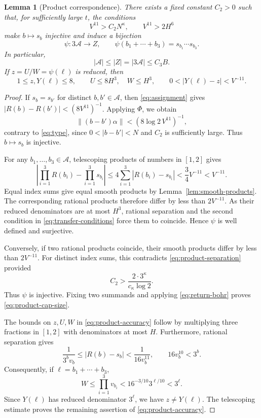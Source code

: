 \documentclass[11pt,reqno]{amsart}
\theoremstyle{definition}
\theoremstyle{plain}
\newtheorem{lemma}{Lemma}[section]
\theoremstyle{definition}
\theoremstyle{remark}
\newcommand{\Bad}{\mathcal A}
\newcommand{\norm}[1]{\lVert#1\rVert}
\begin{document}
\begin{lemma}[Product correspondence]\label{lem:transfer}
There exists a fixed constant $C_2>0$ such
that, for sufficiently large $t$, the conditions
\begin{equation}\label{eq:transfer-conditions}
 V^{11}>C_2N^\kappa,\qquad V^{11}>2H^6
\end{equation}
make $b\mapsto s_b$ injective and induce
a bijection
\begin{equation}\label{eq:bijection}
 \psi:3\Bad\longrightarrow Z,\qquad
 \psi(b_1+\cdots+b_3)=s_{b_1}\cdots s_{b_3}.
\end{equation}
In particular,
\begin{equation}\label{eq:product-cap-size}
 |\Bad|\le|Z|=|3\Bad|\le C_3B.
\end{equation}
If $z=U/W=\psi(\ell)$ is reduced, then
\begin{equation}\label{eq:product-accuracy}
 1\le z,Y(\ell)\le8,\qquad
 U\le8H^3,\quad W\le H^3,\qquad
 0<|Y(\ell)-z|<V^{-11}.
\end{equation}
\end{lemma}

\begin{proof}
If $s_b=s_{b'}$ for distinct $b,b'\in\Bad$,
then \eqref{eq:assignment} gives
$|R(b)-R(b')|<(8V^{11})^{-1}$.
Applying $\Phi$, we obtain
\[
 \norm{(b-b')\alpha}
 <(8\log2\,V^{11})^{-1},
\]
contrary to \eqref{eq:type}, since
$0<|b-b'|<N$ and $C_2$ is sufficiently
large. Thus $b\mapsto s_b$ is injective.

For any $b_1,\ldots,b_3\in\Bad$,
telescoping products of numbers in $[1,2]$
gives
\[
 \left|\prod_{i=1}^3R(b_i)
 -\prod_{i=1}^3s_{b_i}\right|
 \le4\sum_{i=1}^3|R(b_i)-s_{b_i}|
 <\frac34V^{-11}<V^{-11}.
\]
Equal index sums give equal smooth products
by Lemma~\ref{lem:smooth-products}.
The corresponding rational products therefore
differ by less than $2V^{-11}$.
As their reduced denominators are at most
$H^3$, rational separation and the second
condition in \eqref{eq:transfer-conditions}
force them to coincide. Hence $\psi$ is
well defined and surjective.

Conversely, if two rational products coincide,
their smooth products differ by less than
$2V^{-11}$. For distinct index sums, this
contradicts \eqref{eq:product-separation}
provided
\[
 C_2>\frac{2\cdot3^\kappa}{c_\kappa\log2}.
\]
Thus $\psi$ is injective. Fixing two summands
and applying \eqref{eq:return-bohr} proves
\eqref{eq:product-cap-size}.

The bounds on $z,U,W$ in
\eqref{eq:product-accuracy} follow by
multiplying three fractions in $[1,2]$
with denominators at most $H$.
Furthermore, rational separation gives
\[
 \frac1{3^bv_b}
 \le|R(b)-s_b|
 <\frac1{16v_b^{11}},
 \qquad
 16v_b^{10}<3^b.
\]
Consequently, if $\ell=b_1+\cdots+b_3$,
\[
 W\le\prod_{i=1}^3v_{b_i}
 <16^{-3/10}3^{\ell/10}<3^\ell.
\]
Since $Y(\ell)$ has reduced denominator
$3^\ell$, we have $z\ne Y(\ell)$.
The telescoping estimate proves the remaining
assertion of \eqref{eq:product-accuracy}.
\end{proof}
\end{document}
